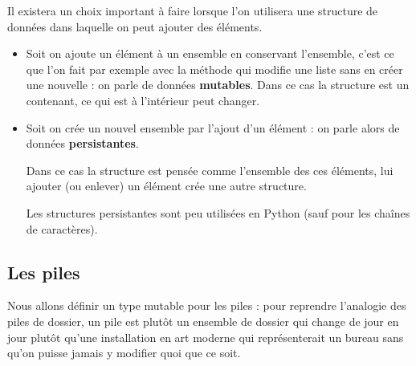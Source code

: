 Il existera un choix important à faire lorsque l'on utilisera une structure de données dans laquelle on peut ajouter des éléments. 

\begin{itemize}
\item Soit on ajoute un élément à un ensemble en conservant l'ensemble, c'est ce que l'on fait par exemple avec la méthode  qui modifie une liste sans en créer une nouvelle : on parle de données {\bf mutables}. Dans ce cas la structure est un contenant, ce qui est à l'intérieur peut changer.

\item Soit on crée un nouvel ensemble par l’ajout d'un élément : on parle alors de données {\bf persistantes}. 

Dans ce cas la structure est pensée comme l'ensemble des ces éléments, lui ajouter (ou enlever) un élément crée une autre structure.

Les structures persistantes sont peu utilisées en Python (sauf pour les chaînes de caractères).
\end{itemize}
\subsection{Les piles}
Nous allons définir un type mutable pour les piles : pour reprendre l'analogie des piles de dossier, un pile est plutôt un ensemble de dossier qui change de jour en jour plutôt qu'une installation en art moderne qui représenterait un bureau sans qu'on puisse jamais y modifier quoi que ce soit.

\medskip

